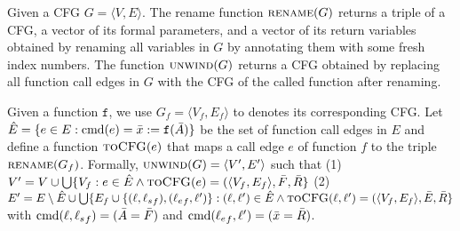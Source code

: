 Given a CFG $G=\langle
V, E \rangle$. The rename function $\textsc{rename}(G)$ returns a triple of a CFG, a vector of its formal parameters, and a vector of its return variables obtained by renaming all variables in $G$ by annotating them with some fresh index numbers. The function $\textsc{unwind}(G)$ returns a CFG obtained by replacing all function call edges in $G$ with the CFG of the called function after renaming. 

Given a function $\mathtt{f}$, we use $G_f=\langle
V_f, E_f \rangle$ to denotes its corresponding CFG.
Let $\hat{E} =\{e\in E: \textmd{cmd} (e)= \bar{x}:=\mathtt{f}(\bar{A})\}$ be the set of function call edges in $E$ and define a function $\textsc{toCFG}(e)$ that maps a call edge $e$ of function $f$ to the triple $\textsc{rename}(G_f)$.
Formally, $\textsc{unwind}(G) = \langle V', E' \rangle$ such that (1) $V' = V\cup \bigcup\{V_f: e\in \hat{E} \wedge \textsc{toCFG}(e)= (\langle V_f, E_f \rangle, \bar{F}, \bar{R} \}$ (2) $E'= E \setminus \hat{E} \cup \bigcup\{E_f\cup\{(\ell, {\ell_s}_f),({\ell_e}_f, \ell')\}: (\ell, \ell')\in \hat{E} \wedge \textsc{toCFG}(\ell, \ell')= (\langle V_f, E_f \rangle, \bar{E}, \bar{R} \}$ with $\textmd{cmd} (\ell, {\ell_s}_f) = (\bar{A}=\bar{F})$ and $\textmd{cmd} ({\ell_e}_f, \ell') = (\bar{x}=\bar{R})$.




